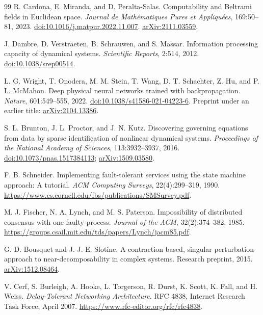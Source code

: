 \begin{thebibliography}{99}
R. Cardona, E. Miranda, and D. Peralta-Salas. Computability and Beltrami fields in Euclidean space. \emph{Journal de Math\'ematiques Pures et Appliqu\'ees}, 169:50--81, 2023. \href{https://doi.org/10.1016/j.matpur.2022.11.007}{doi:10.1016/j.matpur.2022.11.007}. \href{https://arxiv.org/abs/2111.03559}{arXiv:2111.03559}.

J. Dambre, D. Verstraeten, B. Schrauwen, and S. Massar. Information processing capacity of dynamical systems. \emph{Scientific Reports}, 2:514, 2012. \href{https://doi.org/10.1038/srep00514}{doi:10.1038/srep00514}.

L. G. Wright, T. Onodera, M. M. Stein, T. Wang, D. T. Schachter, Z. Hu, and P. L. McMahon. Deep physical neural networks trained with backpropagation. \emph{Nature}, 601:549--555, 2022. \href{https://doi.org/10.1038/s41586-021-04223-6}{doi:10.1038/s41586-021-04223-6}. Preprint under an earlier title: \href{https://arxiv.org/abs/2104.13386}{arXiv:2104.13386}.

S. L. Brunton, J. L. Proctor, and J. N. Kutz. Discovering governing equations from data by sparse identification of nonlinear dynamical systems. \emph{Proceedings of the National Academy of Sciences}, 113:3932--3937, 2016. \href{https://doi.org/10.1073/pnas.1517384113}{doi:10.1073/pnas.1517384113}; \href{https://arxiv.org/abs/1509.03580}{arXiv:1509.03580}.

F. B. Schneider. Implementing fault-tolerant services using the state machine approach: A tutorial. \emph{ACM Computing Surveys}, 22(4):299--319, 1990. \url{https://www.cs.cornell.edu/fbs/publications/SMSurvey.pdf}.

M. J. Fischer, N. A. Lynch, and M. S. Paterson. Impossibility of distributed consensus with one faulty process. \emph{Journal of the ACM}, 32(2):374--382, 1985. \url{https://groups.csail.mit.edu/tds/papers/Lynch/jacm85.pdf}.

G. D. Bousquet and J.-J. E. Slotine. A contraction based, singular perturbation approach to near-decomposability in complex systems. Research preprint, 2015. \href{https://arxiv.org/abs/1512.08464}{arXiv:1512.08464}.

V. Cerf, S. Burleigh, A. Hooke, L. Torgerson, R. Durst, K. Scott, K. Fall, and H. Weiss. \emph{Delay-Tolerant Networking Architecture}. RFC 4838, Internet Research Task Force, April 2007. \url{https://www.rfc-editor.org/rfc/rfc4838}.


\end{thebibliography}
